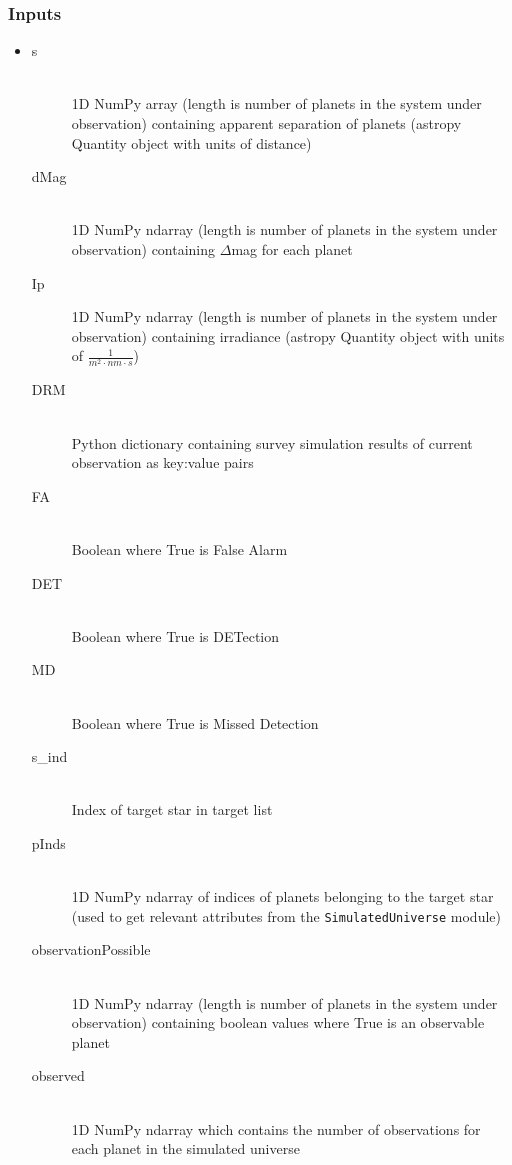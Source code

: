 \documentclass[cleanfoot]{asme2ej}
\begin{document}
\subsubsection*{Inputs}
\begin{itemize}
    \item 
    \begin{description}
        \item[s] \hfill \\
        1D NumPy array (length is number of planets in the system under observation) containing apparent separation of planets (astropy Quantity object with units of distance)
        \item[dMag] \hfill \\
        1D NumPy ndarray (length is number of planets in the system under observation) containing $ \Delta $mag for each planet
        \item[Ip] \hfill
        1D NumPy ndarray (length is number of planets in the system under observation) containing irradiance (astropy Quantity object with units of $ \frac{1}{m^2 \cdot nm \cdot s} $)
        \item[DRM] \hfill \\
        Python dictionary containing survey simulation results of current observation as key:value pairs
        \item[FA] \hfill \\
        Boolean where True is False Alarm
        \item[DET] \hfill \\
        Boolean where True is DETection
        \item[MD] \hfill \\
        Boolean where True is Missed Detection
        \item[s\_ind] \hfill \\
        Index of target star in target list
        \item[pInds] \hfill \\
        1D NumPy ndarray of indices of planets belonging to the target star (used to get relevant attributes from the \verb+SimulatedUniverse+ module)
        \item[observationPossible] \hfill \\
        1D NumPy ndarray (length is number of planets in the system under observation) containing boolean values where True is an observable planet
        \item[observed] \hfill \\
        1D NumPy ndarray which contains the number of observations for each planet in the simulated universe
    \end{description}
\end{itemize}
\end{document}
